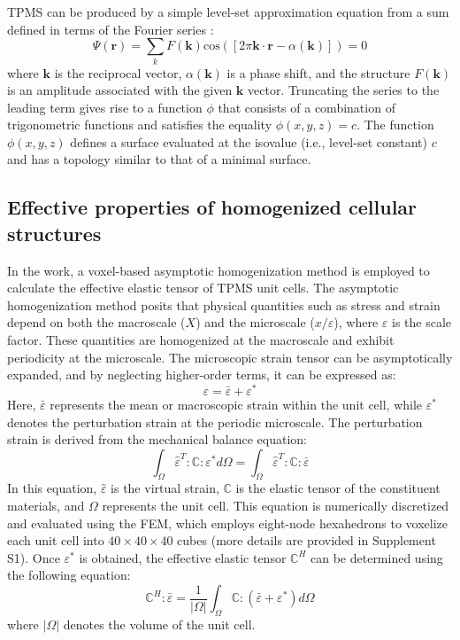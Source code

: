 \documentclass[preprint,review,12pt,authoryear]{elsarticle}
\begin{document}
TPMS can be produced by a simple level-set approximation equation from a sum defined in terms of the Fourier series \citep{Gandy2001,Al-Ketan2019}:
\begin{equation}
 \Psi(\boldsymbol{r})=\sum_kF(\boldsymbol{k})\text{cos}([2\pi \boldsymbol{k}\cdot \boldsymbol{r}-\alpha(\boldsymbol{k})])=0
\label{eq:1}
\end{equation}
where $\boldsymbol{k}$ is the reciprocal vector, $\alpha(\boldsymbol{k})$ is a phase shift, and the structure $F(\boldsymbol{k})$ is an amplitude associated with the given $\boldsymbol{k}$ vector. Truncating the series to the leading term gives rise to a function $\phi$ that consists of a combination of trigonometric functions and satisfies the equality $\phi(x,y,z)=c$. The function $\phi(x, y, z)$ defines a surface evaluated at the isovalue (i.e., level-set constant) $c$ and has a topology similar to that of a minimal surface. 

\subsection{Effective properties of homogenized cellular structures}
\label{subsec:homo}

In the work, a voxel-based asymptotic homogenization method \citep{Dong2019} is employed to calculate the effective elastic tensor of TPMS unit cells. The asymptotic homogenization method posits that physical quantities such as stress and strain depend on both the macroscale ($X$) and the microscale ($x/\varepsilon$), where $\varepsilon$ is the scale factor. These quantities are homogenized at the macroscale and exhibit periodicity at the microscale. The microscopic strain tensor can be asymptotically expanded, and by neglecting higher-order terms, it can be expressed as:
\begin{equation}
    \varepsilon = \bar{\varepsilon} + \varepsilon^{*}
\label{eq:2}
\end{equation}
Here, $\bar{\varepsilon}$ represents the mean or macroscopic strain within the unit cell, while $\varepsilon^{*}$ denotes the perturbation strain at the periodic microscale. The perturbation strain is derived from the mechanical balance equation:
\begin{equation}
\int_{\Omega}\hat{\varepsilon}^T:\mathbb{C}:\varepsilon^{*}d\Omega = \int_{\Omega}\hat{\varepsilon}^T:\mathbb{C}:\bar{\varepsilon}
\label{eq:3}
\end{equation}
In this equation, $\hat{\varepsilon}$ is the virtual strain, $\mathbb{C}$ is the elastic tensor of the constituent materials, and $\Omega$ represents the unit cell. This equation is numerically discretized and evaluated using the FEM, which employs eight-node hexahedrons to voxelize each unit cell into $40 \times 40 \times 40$ cubes (more details are provided in Supplement S1). Once $\varepsilon^{*}$ is obtained, the effective elastic tensor $\mathbb{C}^H$ can be determined using the following equation:
\begin{equation}
\mathbb{C}^H:\bar{\varepsilon} = \frac{1}{|\Omega|}\int_{\Omega}\mathbb{C}:(\bar{\varepsilon}+\varepsilon^{*})d\Omega
    \label{eq:4}
\end{equation}
where $|\Omega|$ denotes the volume of the unit cell.
\end{document}
